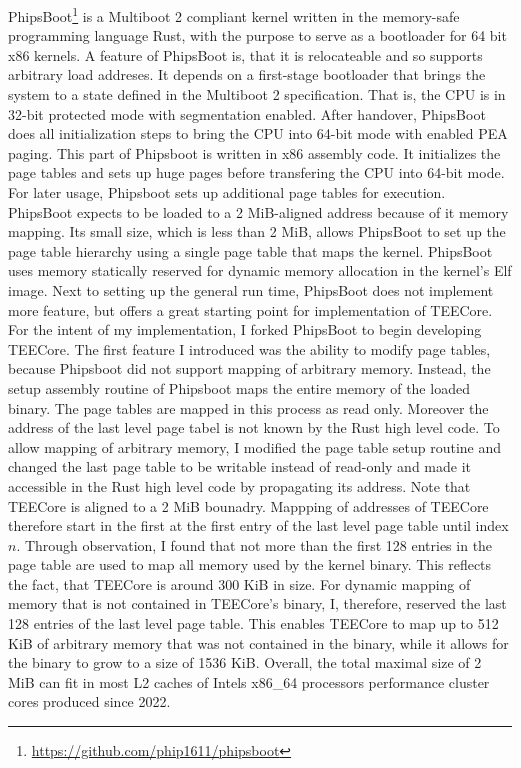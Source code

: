PhipsBoot\footnote{\url{https://github.com/phip1611/phipsboot}} is a Multiboot 2
compliant kernel written in the memory-safe programming language Rust, with the
purpose to serve as a bootloader for 64 bit x86 kernels. A feature of PhipsBoot
is, that it is relocateable and so supports arbitrary load addreses. It depends
on a first-stage bootloader
that brings the system to a state defined in the Multiboot 2 specification. That
is, the CPU is in 32-bit protected mode with segmentation enabled. After
handover, PhipsBoot does all initialization steps to bring the CPU into 64-bit
mode with enabled PEA paging. This part of Phipsboot is written in x86 assembly
code. It initializes the page tables and sets up huge pages before transfering
the CPU into 64-bit mode. For later usage, Phipsboot sets up additional page
tables for execution. PhipsBoot expects to be loaded to a 2 MiB-aligned address
because of it memory mapping. Its small size, which is less than 2 MiB, allows
PhipsBoot to set up the page table hierarchy using a single page table that maps
the kernel. PhipsBoot uses memory statically reserved for dynamic memory
allocation in the kernel's Elf image. Next to setting up the general run time,
PhipsBoot does not implement more feature, but offers a great starting point for
implementation of TEECore. \\

For the intent of my implementation, I forked PhipsBoot to begin developing
TEECore. The first feature I introduced was the ability to modify page tables,
because Phipsboot did not support mapping of arbitrary memory. Instead, the
setup assembly routine of Phipsboot maps the entire memory of the loaded binary.
The page tables are mapped in this process as read only. Moreover the address of
the last level page tabel is not known by the Rust high level code. To allow
mapping of arbitrary memory, I modified the page table setup routine and changed
the last page table to be writable instead of read-only and made it accessible
in the Rust high level code by propagating its address. Note that TEECore is
aligned to a 2 MiB bounadry. Mappping of addresses of TEECore therefore start in
the first at the first entry of the last level page table until index $n$.
Through observation, I found that not more than the first 128 entries in the
page table are used to map all memory used by the kernel binary. This reflects
the fact, that TEECore is around 300 KiB in size. For dynamic mapping of memory
that is not contained in TEECore's binary, I, therefore, reserved the last 128
entries of the last level page table. This enables TEECore to map up to 512 KiB
of arbitrary memory that was not contained in the binary, while it allows for
the binary to grow to a size of 1536 KiB. Overall, the total maximal size of 2
MiB can fit in most L2 caches of Intels x86\_64 processors performance cluster
cores produced since 2022.\\

